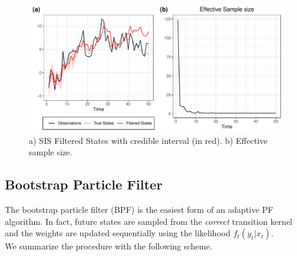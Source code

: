 \documentclass[
]{book}
\theoremstyle{break}
\theoremstyle{nonumberplain}
\begin{document}
\begin{figure}[H]

{\centering \includegraphics{nuova-final-draft_files/figure-latex/unnamed-chunk-10-1} 

}

\caption{a) SIS Filtered States with credible interval (in red). b) Effective sample size.}\label{fig:unnamed-chunk-10}
\end{figure}

\subsection{Bootstrap Particle Filter}

The bootstrap particle filter (BPF) is the easiest form of an adaptive
PF algorithm. In fact, future states are sampled from the
\textit{correct} transition kernel and the weights are updated
sequentially using the likelihood \(f_t(y_t|x_t)\).\\
We summarize the procedure with the following scheme.
\end{document}
